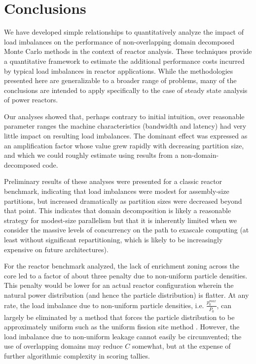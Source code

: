 \section{Conclusions}

We have developed simple relationships to quantitatively analyze the impact of
load imbalances on the performance of non-overlapping domain decomposed Monte
Carlo methods in the context of reactor analysis. These techniques provide a
quantitative framework to estimate the additional performance costs incurred by
typical load imbalances in reactor applications. While the methodologies
presented here are generalizable to a broader range of problems, many of the
conclusions are intended to apply specifically to the case of steady state
analysis of power reactors.

Our analyses showed that, perhaps contrary to initial intuition, over reasonable
parameter ranges the machine characteristics (bandwidth and latency) had very
little impact on resulting load imbalances. The dominant effect was expressed as
an amplification factor whose value grew rapidly with decreasing partition size,
and which we could roughly estimate using results from a non-domain-decomposed
code.

Preliminary results of these analyses were presented for a classic reactor
benchmark, indicating that load imbalances were modest for assembly-size
partitions, but increased dramatically as partition sizes were decreased beyond
that point. This indicates that domain decomposition is likely a reasonable
strategy for modest-size parallelism but that it is inherently limited when we
consider the massive levels of concurrency on the path to exascale computing (at
least without significant repartitioning, which is likely to be increasingly
expensive on future architectures).

For the reactor benchmark analyzed, the lack of enrichment zoning across the
core led to a factor of about three penalty due to non-uniform particle
densities. This penalty would be lower for an actual reactor configuration
wherein the natural power distribution (and hence the particle distribution) is
flatter. At any rate, the load imbalance due to non-uniform particle densities,
i.e. $\frac{p_0^{max}}{\overline{P_0}}$, can largely be eliminated by a method
that forces the particle distribution to be approximately uniform such as the
uniform fission site method \cite{physor-kelly-2012}. However, the load
imbalance due to non-uniform leakage cannot easily be circumvented; the use of
overlapping domains may reduce $C$ somewhat, but at the expense of further
algorithmic complexity in scoring tallies.

